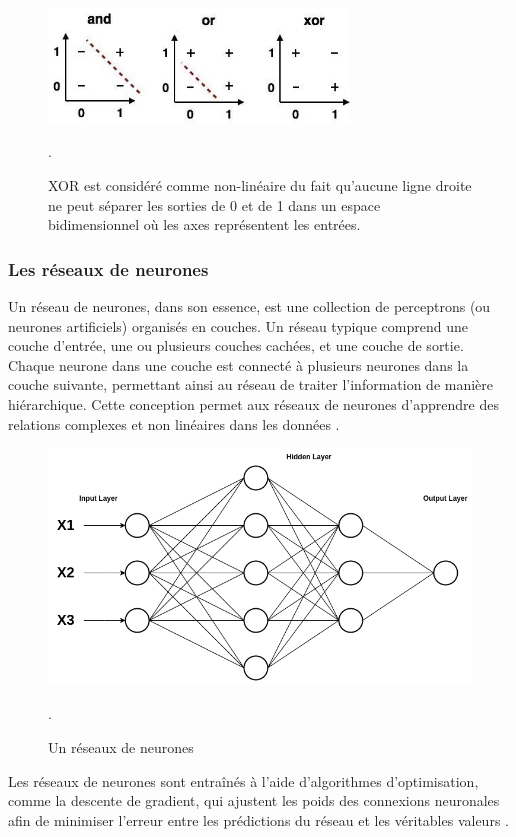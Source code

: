 \begin{figure}[H]
    \centering
    \includegraphics[width=8cm]{gfx/fig-perceptron-xor.png}
    \caption{XOR est considéré comme non-linéaire du fait qu'aucune ligne droite ne peut séparer les sorties de 0 et de 1 dans un espace bidimensionnel où les axes représentent les entrées. \cite{Jaspreet_2022}}.
    \label{fig:perceptron-xor}
\end{figure}

\subsubsection{Les réseaux de neurones}

Un réseau de neurones, dans son essence, est une collection de perceptrons (ou neurones artificiels) organisés en couches. Un réseau typique comprend une couche d'entrée, une ou plusieurs couches cachées, et une couche de sortie. Chaque neurone dans une couche est connecté à plusieurs neurones dans la couche suivante, permettant ainsi au réseau de traiter l'information de manière hiérarchique. Cette conception permet aux réseaux de neurones d'apprendre des relations complexes et non linéaires dans les données \cite{Jaspreet_2022, Min69}.

\begin{figure}[H]
    \centering
    \includegraphics[width=12cm]{gfx/fig-nn.png}
    \caption{Un réseaux de neurones}.
    \label{fig:perceptron}
\end{figure}

Les réseaux de neurones sont entraînés à l'aide d'algorithmes d'optimisation, comme la descente de gradient, qui ajustent les poids des connexions neuronales afin de minimiser l'erreur entre les prédictions du réseau et les véritables valeurs \cite{antoine2018apprentissage}.

